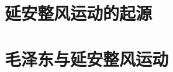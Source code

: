 \documentclass{GaoHua}
\begin{document}
\frontmatter



\tableofcontents

\mainmatter

\part{延安整风运动的起源}







\part{毛泽东与延安整风运动}












\backmatter



\end{document}
